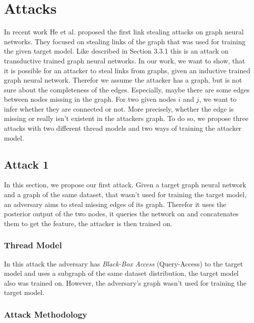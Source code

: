 \chapter{Attacks}

  In recent work He et al. \cite{DBLP:journals/corr/abs-2005-02131} proposed the first link stealing attacks on graph neural networks.
  They focused on stealing links of the graph that was used for training the given target model.
  Like described in Section 3.3.1 this is an attack on transductive trained graph neural networks.
  In our work, we want to show, that it is possible for an attacker to steal links from graphs, given an inductive trained graph neural network.
  Therefor we assume the attacker has a graph, but is not sure about the completeness of the edges. Especially, maybe there are some edges between nodes missing in the graph.
  For two given nodes $i$ and $j$, we want to infer whether they are connected or not. More precisely, whether the edge is missing or really isn't existent in the attackers graph.
  To do so, we propose three attacks with two different thread models and two ways of training the attacker model.

  \section{Attack 1}

    In this section, we propose our first attack. Given a target graph neural network and a graph of the same dataset, that wasn't used for training the target model, an adversary aims to steal missing edges of its graph.
    Therefor it uses the posterior output of the two nodes, it queries the network on and concatenates them to get the feature, the attacker is then trained on.

    \subsection{Thread Model}

      In this attack the adversary has \emph{Black-Box Access} (Query-Access) to the target model and uses a subgraph of the same dataset distribution, the target model also was trained on.
      However, the adversary's graph wasn't used for training the target model.

    \subsection{Attack Methodology}

